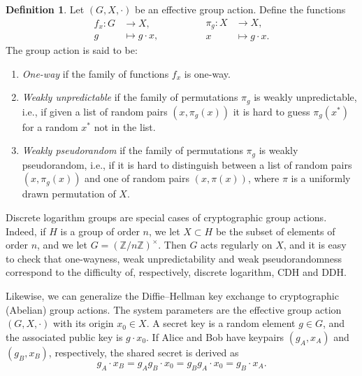 \documentclass[10pt]{article}
\theoremstyle{plain}
\theoremstyle{definition}
\newtheorem{definition}[theorem]{Definition}
\begin{document}
\begin{prposition}
\begin{definition}
  Let $(G,X,·)$ be an effective group action. %
  Define the functions
  \begin{equation*}
    \begin{aligned}
      f_x : G &\to X,\\
      g &\mapsto g·x,
    \end{aligned}
    \qquad\qquad
    \begin{aligned}
      \pi_g : X &\to X,\\
      x &\mapsto g·x.
    \end{aligned}
  \end{equation*}
  The group action is said to be:
  \begin{enumerate}
  \item \emph{One-way} if the family of functions $f_x$ is one-way.
  \item \emph{Weakly unpredictable} if the family of permutations
    $\pi_g$ is weakly unpredictable, i.e., if given a list of random
    pairs $(x,\pi_g(x))$ it is hard to guess $\pi_g(x^*)$ for a random
    $x^*$ not in the list.
  \item \emph{Weakly pseudorandom} if the family of permutations
    $\pi_g$ is weakly pseudorandom, i.e., if it is hard to distinguish
    between a list of random pairs $(x,\pi_g(x))$ and one of random
    pairs $(x,\pi(x))$, where $\pi$ is a uniformly drawn permutation
    of $X$.
  \end{enumerate}
\end{definition}

Discrete logarithm groups are special cases of cryptographic group
actions. %
Indeed, if $H$ is a group of order $n$, we let $X⊂H$ be the subset of
elements of order $n$, and we let $G = (ℤ/nℤ)^\times$. %
Then $G$ acts regularly on $X$, and it is easy to check that
one-wayness, weak unpredictability and weak pseudorandomness
correspond to the difficulty of, respectively, discrete logarithm, CDH
and DDH.

Likewise, we can generalize the Diffie--Hellman key exchange to
cryptographic (Abelian) group actions. %
The system parameters are the effective group action $(G,X,·)$ with
its origin $x_0∈X$. %
A secret key is a random element $g∈G$, and the associated public key
is $g·x_0$. %
If Alice and Bob have keypairs $(g_A,x_A)$ and $(g_B,x_B)$,
respectively, the shared secret is derived as
\begin{equation*}
  g_A·x_B = g_Ag_B· x_0 = g_Bg_A·x_0 = g_B·x_A.
\end{equation*}


\end{prposition}
\end{document}

